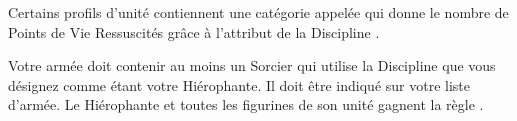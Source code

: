 \newcommand{\phatepscurserule}{%
Le \casketofphatep{} possède un \boundspell{4} : \sandsspellfour{} (Discipline \sands{}). Il ne peut l'utiliser que s'il ne s'est pas déplacé durant ce Tour de Joueur.
}


\newcommand{\charnelcatapultrule}{%
\textbf{\artilleryweapon} de type \textbf{\catapult{} (\distance{3})}.\newline
\range{12-60}, \Strength{} 3 [9], [\multiplewounds{\ordnance}{}].
}

\newcommand{\cursedammunitionrule}{%
\textbf{\artilleryweapon} de type \textbf{\catapult{} (\distance{5})}.\newline
\range{12-48}, \Strength{} 3, \flamingattacks{}, \magicalattacks{}.

Une unité qui subit au moins une perte causée par cette arme doit subir un test de Panique comme si elle avait subi au moins 25\% de pertes. Ce test est fait avec un malus de -1 en Commandement.
}


\newcommand{\QRSnote}{%
\noindent\refsymbol{} Perd les \charioteers{} quand il sert de monture.
}

\newcommand{\allcharacters}{Personnages}
\newcommand{\allundeadconstructs}{Constructions Mort-Vivantes}
\newcommand{\allwarmachines}{Machines de Guerre}
















\startarmywiderules

\armyspecialruleentry{\risen}

Certains profils d'unité contiennent une catégorie appelée \risen{} qui donne le nombre de Points de Vie Ressuscités grâce à l'attribut \sandsattribute{} de la Discipline \sands{}.


Votre armée doit contenir au moins un Sorcier qui utilise la Discipline \sands{} que vous désignez comme étant votre Hiérophante. Il doit être indiqué sur votre liste d'armée. Le Hiérophante et toutes les figurines de son unité gagnent la règle .

\closearmywiderules








